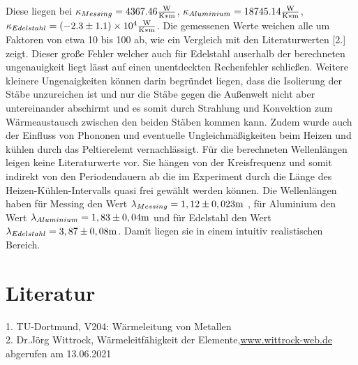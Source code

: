 Diese liegen bei $\kappa_{Messing}=4367.46\si[]{\frac{W}{K*m}}$,
$\kappa_{Aluminium}=18745.14\si[]{\frac{W}{K*m}}$,  $\kappa_{Edelstahl}=(-2.3\pm 1.1)\times 10^{4}\si[]{\frac{W}{K*m}}$. 
Die gemessenen Werte weichen alle um Faktoren von etwa 10 bis 100 ab, wie ein Vergleich mit den Literaturwerten 
[2.] zeigt. Dieser  große Fehler welcher auch für Edelstahl auserhalb der berechneten ungenauigkeit 
liegt lässt auf einen unentdeckten Rechenfehler schließen. Weitere kleinere Ungenaigkeiten können darin begründet 
liegen, dass die Isolierung der Stäbe unzureichen ist und nur die Stäbe gegen die Außenwelt nicht aber untereinander
abschirmt und es somit durch Strahlung und Konvektion zum Wärmeaustausch zwischen den beiden Stäben kommen kann.
Zudem wurde auch der Einfluss von Phononen und eventuelle Ungleichmäßigkeiten beim Heizen und kühlen
durch das Peltierelemt vernachlässigt.
Für die berechneten Wellenlängen leigen keine Literaturwerte vor. Sie hängen von der Kreisfrequenz und somit indirekt
von den Periodendauern ab die im Experiment durch die Länge des Heizen-Kühlen-Intervalls quasi frei gewählt werden 
können. Die Wellenlängen haben für Messing den Wert $\lambda_{Messing}=1,12\pm 0,023\si[]{m}$ , für Aluminium den Wert $\lambda_{Aluminium}=1,83\pm 0,04\si[]{m}$ und für Edelstahl den Wert $\lambda_{Edelstahl}=3,87\pm 0,08\si[]{m}$. Damit liegen
sie in einem intuitiv realistischen Bereich.
\section{Literatur}
1. TU-Dortmund, V204: Wärmeleitung von Metallen\\
2. Dr.Jörg Wittrock, Wärmeleitfähigkeit der Elemente,\hyperlink{http://www.wittrock-web.de/pse_leit_th.html}{www.wittrock-web.de} abgerufen am 13.06.2021